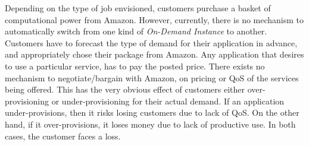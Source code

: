 \documentclass[10pt,journal,compsoc]{IEEEtran}
\begin{document}
Depending on the type of job envisioned, customers purchase a basket of computational power from Amazon. However, currently, there is no mechanism to automatically switch from one kind of \textit{On-Demand Instance} to another. Customers have to forecast the type of demand for their application in advance, and appropriately chose their package from Amazon. Any application that desires to use a particular service, has to pay the posted price. There exists no mechanism to negotiate/bargain with Amazon, on pricing or QoS of the services being offered. This has the very obvious effect of customers either over-provisioning or under-provisioning for their actual demand. If an application under-provisions, then it risks losing customers due to lack of QoS. On the other hand, if it over-provisions, it loses money due to lack of productive use. In both cases, the customer faces a loss.
\end{document}

